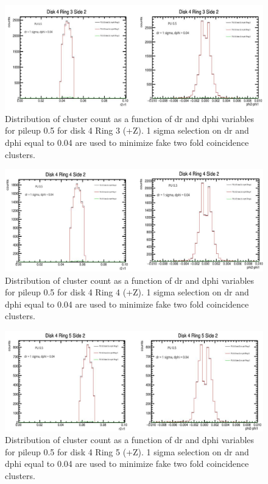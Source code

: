 \begin{figure}[!htp]
\centering
\includegraphics[width=1\textwidth]{ashish_thesis/D4R3S2_dr_dphi_cut.png}
\caption{%
    Distribution of cluster count as a function of dr and dphi variables for pileup 0.5 for disk 4 Ring 3 (+Z). 1 sigma selection on dr and dphi equal to 0.04 are used to minimize fake two fold coincidence clusters.
}
\label{fig:cluster_ring}
\end{figure}



\begin{figure}[!htp]
\centering
\includegraphics[width=1\textwidth]{ashish_thesis/D4R4S2_dr_dphi_cut.png}
\caption{%
  Distribution of cluster count as a function of dr and dphi variables for pileup 0.5 for disk 4 Ring 4 (+Z). 1 sigma selection on dr and dphi equal to 0.04 are used to minimize fake two fold coincidence clusters.  
}
\label{fig:cluster_ring}
\end{figure}



\begin{figure}[!htp]
\centering
\includegraphics[width=1\textwidth]{ashish_thesis/D4R5S2_dr_dphi_cut.png}
\caption{%
  Distribution of cluster count as a function of dr and dphi variables for pileup 0.5 for disk 4 Ring 5 (+Z). 1 sigma selection on dr and dphi equal to 0.04 are used to minimize fake two fold coincidence clusters.  
}
\label{fig:cluster_ring}
\end{figure}


